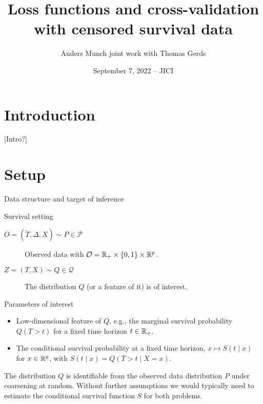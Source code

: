 \documentclass[smaller]{beamer}\usepackage{listings}
\institute{PhD Student, Section of Biostatistics \\ University of Copenhagen}
\author{Anders Munch \newline \small joint work with Thomas Gerds}
\date{September 7, 2022 -- JICI}
\title{Loss functions and cross-validation with censored survival data}
\begin{document}
\maketitle
\section{Introduction}
\label{sec:orgbbe5c3a}
\begin{frame}[label={sec:org6b5005a}]{[Intro?]}
\end{frame}
\section{Setup}
\label{sec:orgf24f6dc}
\begin{frame}[label={sec:org532680f}]{Data structure and target of inference}
\small
\begin{block}{Survival setting}
\begin{description}
\item[{\(O = (\tilde T, \Delta, X) \sim P \in \mathcal{P}\)}] Oberved data with \(\mathcal{O} = \mathbb{R}_+
  \times \{0,1\} \times \mathbb{R}^p\).
\item[{\(Z = (T, X) \sim Q \in \mathcal{Q}\)}] The distribution \(Q\) (or a feature of it) is of interest.
\end{description}
\end{block}

\begin{block}{Parameters of interest}
\begin{itemize}
\item Low-dimensional feature of \(Q\), e.g., the marginal survival probability \(Q(T > t)\) for a fixed
time horizon \(t \in \mathbb{R}_+\).
\item The conditional survival probability at a fixed time horizon, \(x \mapsto S(t \mid x)\) for \(x
  \in \mathbb{R}^p\), with \(S(t \mid x) = Q(T > t \mid X=x)\).
\end{itemize}

\hfill

The distribution \(Q\) is identifiable from the observed data distribution \(P\) under coarsening at
random. Without further assumptions we would typically need to estimate the conditional survival
function \(S\) for both problems.
\end{block}
\end{frame}
\end{document}
